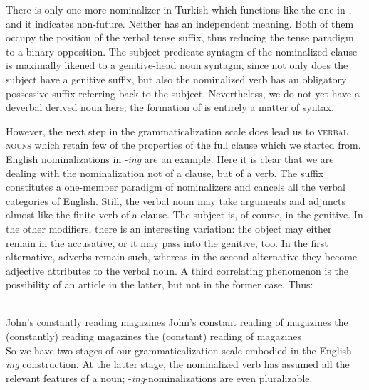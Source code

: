 \noindent There is only one more nominalizer in Turkish which functions like the one in , and it indicates non-future. Neither has an independent meaning. Both of them occupy the position of the verbal tense suffix, thus reducing the tense paradigm to a binary opposition. The subject-predicate syntagm of the nominalized clause is maximally likened to a genitive-head noun syntagm, since not only does the subject have a genitive suffix, but also the nominalized verb has an obligatory possessive suffix referring back to the subject. Nevertheless, we do not yet have a deverbal derived noun here; the formation of  is entirely a matter of syntax.

However, the next step in the grammaticalization scale does lead us to \textsc{verbal nouns} which retain few of the properties of the full clause which we started from. English nominalizations in -\textit{ing} are an example. Here it is clear that we are dealing with the nominalization not of a clause, but of a verb. The suffix constitutes a one-member paradigm of nominalizers and cancels all the verbal categories of English. Still, the verbal noun may take arguments and adjuncts almost like the finite verb of a clause. The subject is, of course, in the genitive. In the other modifiers, there is an interesting variation: the object may either remain in the accusative, or it may pass into the genitive, too. In the first alternative, adverbs remain such, whereas in the second alternative they become adjective attributes to the verbal noun. A third correlating phenomenon is the possibility of an article in the latter, but not in the former case. Thus:

\ea\label{ex:E30}
\langinfo{\LangEngl}{}{} \\
\ea John's constantly reading magazines
\ex John's constant reading of magazines
\ex *the (constantly) reading magazines
\ex the (constant) reading of magazines\\
\z
\z
\noindent So we have two stages of our grammaticalization scale embodied in the English \glposs-\textit{ing} construction. At the latter stage, the nominalized verb has assumed all the relevant features of a noun; -\textit{ing}{}-nominalizations are even pluralizable.


